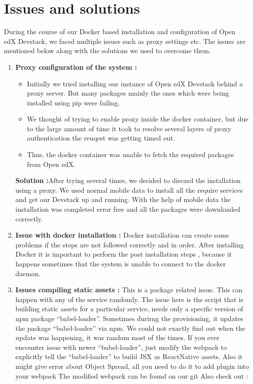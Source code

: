 \section{Issues and solutions}
During the course of our Docker based installation and configuration of Open edX Devstack,
we faced multiple issues such as proxy settings etc. The issues are mentioned below along
with the solutions we used to overcome them.
\begin{enumerate}
	\item \textbf{Proxy configuration of the system :}\newline
		\begin{itemize}
		\item Initially we tried installing our instance of Open edX Devstack behind a proxy server. But
many packages mainly the ones which were being installed using pip were failing.
		\item We thought of trying to enable proxy inside the docker container, but due to the large
amount of time it took to resolve several layers of proxy authentication the reuqest was
getting timed out.
		\item Thus, the docker container was unable to fetch the required packages from Open edX.
		\end{itemize}
		\textbf{Solution :}After trying several times, we decided to discard the installation using a proxy.
We used normal mobile data to install all the require services and get our Devstack up and
running. With the help of mobile data the installation was completed error free and all the
packages were downloaded correctly.
	\item \textbf{Issue with docker installation : }\newline
		Docker isntallation can create some problems if the steps are not followed correctly and in
order. After installing Docker it is important to perform the post installation steps ,
because it happens sometimes that the system is unable to connect to the docker daemon.
	\item \textbf{Issues compiling static assets : }\newline
This is a package related issue. This can happen with any of the service randomly. The issue here is
the script that is building static assets for a particular service, needs only a specific version of npm
package “babel-loader”. Sometimes durirng the provisioning, it updates the package “babel-loader”
via npm. We could not exactly find out when the update was happening, it was random most of the
times. If you ever encounter issue with newer “babel-loader”, just modify the webpack to explicitly
tell the “babel-loader” to build JSX as ReactNative assets. Also it might give error about Object
Spread, all you need to do it to add plugin into your webpack\newline
The modified webpack can be found on our git\newline
Also check out :\newline


\end{enumerate}
